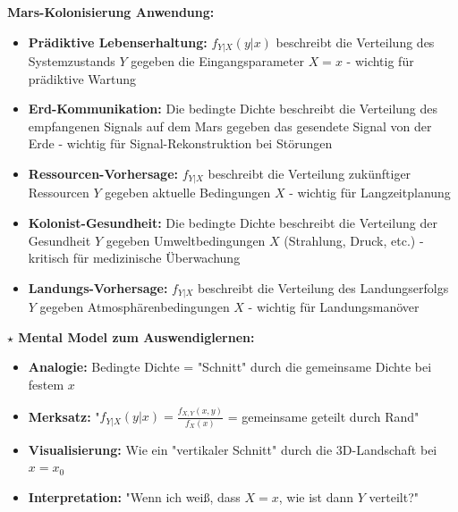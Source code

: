 \begin{denoobification}
\textbf{Mars-Kolonisierung Anwendung:}
\begin{itemize}
    \item \textbf{Prädiktive Lebenserhaltung:} $f_{Y|X}(y|x)$ beschreibt die Verteilung des Systemzustands $Y$ gegeben die Eingangsparameter $X = x$ - wichtig für prädiktive Wartung
    \item \textbf{Erd-Kommunikation:} Die bedingte Dichte beschreibt die Verteilung des empfangenen Signals auf dem Mars gegeben das gesendete Signal von der Erde - wichtig für Signal-Rekonstruktion bei Störungen
    \item \textbf{Ressourcen-Vorhersage:} $f_{Y|X}$ beschreibt die Verteilung zukünftiger Ressourcen $Y$ gegeben aktuelle Bedingungen $X$ - wichtig für Langzeitplanung
    \item \textbf{Kolonist-Gesundheit:} Die bedingte Dichte beschreibt die Verteilung der Gesundheit $Y$ gegeben Umweltbedingungen $X$ (Strahlung, Druck, etc.) - kritisch für medizinische Überwachung
    \item \textbf{Landungs-Vorhersage:} $f_{Y|X}$ beschreibt die Verteilung des Landungserfolgs $Y$ gegeben Atmosphärenbedingungen $X$ - wichtig für Landungsmanöver
\end{itemize}

\textbf{$\star$ Mental Model zum Auswendiglernen:}
\begin{itemize}
    \item \textbf{Analogie:} Bedingte Dichte = "Schnitt" durch die gemeinsame Dichte bei festem $x$
    \item \textbf{Merksatz:} "$f_{Y|X}(y|x) = \frac{f_{X,Y}(x,y)}{f_X(x)}$ = gemeinsame geteilt durch Rand"
    \item \textbf{Visualisierung:} Wie ein "vertikaler Schnitt" durch die 3D-Landschaft bei $x = x_0$
    \item \textbf{Interpretation:} "Wenn ich weiß, dass $X = x$, wie ist dann $Y$ verteilt?"
\end{itemize}

\begin{center}
\end{center}
\end{denoobification}
